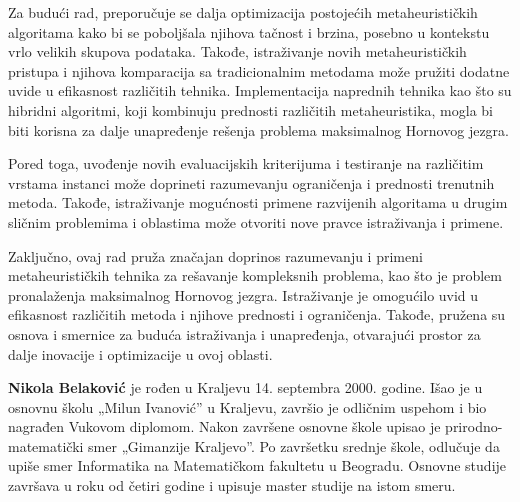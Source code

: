 \documentclass[12pt,oneside]{memoir}
\begin{document}
Za budući rad, preporučuje se dalja optimizacija postojećih metaheurističkih algoritama kako bi se poboljšala njihova tačnost i brzina, posebno u kontekstu vrlo velikih skupova podataka. Takođe, istraživanje novih metaheurističkih pristupa i njihova komparacija sa tradicionalnim metodama može pružiti dodatne uvide u efikasnost različitih tehnika. Implementacija naprednih tehnika kao što su hibridni algoritmi, koji kombinuju prednosti različitih metaheuristika, mogla bi biti korisna za dalje unapređenje rešenja problema maksimalnog Hornovog jezgra.

Pored toga, uvođenje novih evaluacijskih kriterijuma i testiranje na različitim vrstama instanci može doprineti razumevanju ograničenja i prednosti trenutnih metoda. Takođe, istraživanje mogućnosti primene razvijenih algoritama u drugim sličnim problemima i oblastima može otvoriti nove pravce istraživanja i primene.

Zaključno, ovaj rad pruža značajan doprinos razumevanju i primeni metaheurističkih tehnika za rešavanje kompleksnih problema, kao što je problem pronalaženja maksimalnog Hornovog jezgra. Istraživanje je omogućilo uvid u efikasnost različitih metoda i njihove prednosti i ograničenja. Takođe, pružena su osnova i smernice za buduća istraživanja i unapređenja, otvarajući prostor za dalje inovacije i optimizacije u ovoj oblasti.

% 


\literatura

\backmatter

\begin{biografija}
  \textbf{Nikola Belaković} je rođen u Kraljevu 14. septembra 2000. godine.
  Išao je u osnovnu školu „Milun Ivanović” u Kraljevu, završio je odličnim uspehom
  i bio nagrađen Vukovom diplomom. Nakon završene osnovne škole
  upisao je prirodno-matematički smer „Gimanzije Kraljevo”.
  Po završetku srednje škole, odlučuje da upiše smer Informatika na Matematičkom fakultetu u Beogradu.
  Osnovne studije završava u roku od četiri godine i upisuje master studije na istom smeru.
  

\end{biografija}
\end{document}
